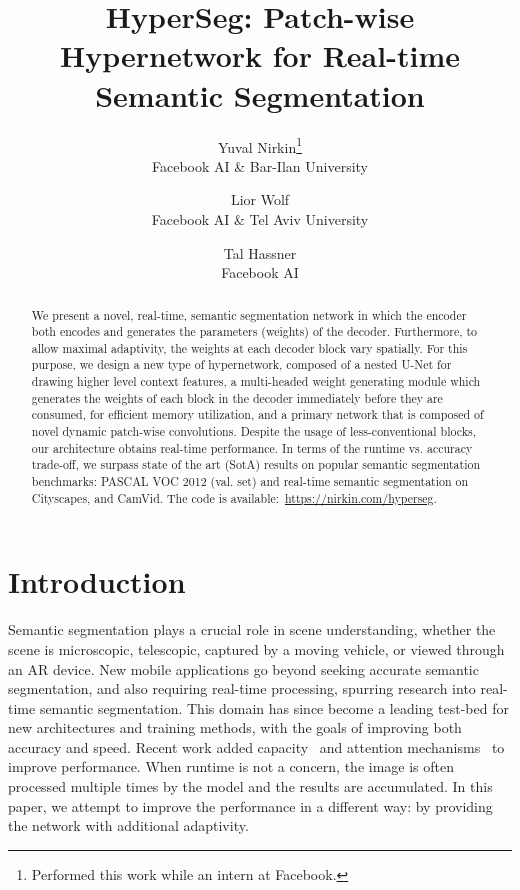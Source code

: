\documentclass[final]{cvpr}
\begin{document}
\title{HyperSeg: Patch-wise Hypernetwork for Real-time Semantic Segmentation}

\author{Yuval Nirkin\thanks{Performed this work while an intern at Facebook.}\\
Facebook AI \& Bar-Ilan University\\
\and
Lior Wolf\\
Facebook AI \& Tel Aviv University\\
\and
Tal Hassner\\
Facebook AI}


\maketitle


\begin{abstract}
We present a novel, real-time, semantic segmentation network in which the encoder both encodes and generates the parameters (weights) of the decoder. Furthermore, to allow maximal adaptivity, the weights at each decoder block vary spatially. For this purpose, we design a new type of hypernetwork, composed of a nested U-Net for drawing higher level context features, a multi-headed weight generating module which generates the weights of each block in the decoder immediately before they are consumed, for efficient memory utilization, and a primary network that is composed of novel dynamic patch-wise convolutions. Despite the usage of less-conventional blocks, our architecture obtains real-time performance. In terms of the runtime vs. accuracy trade-off, we surpass state of the art (SotA) results on popular semantic segmentation benchmarks: PASCAL VOC 2012 (val. set) and real-time semantic segmentation on Cityscapes, and CamVid.
The code is available:~\url{https://nirkin.com/hyperseg}.
\end{abstract}

\section{Introduction}
\label{sec:Introduction}

Semantic segmentation plays a crucial role in scene understanding, whether the scene is microscopic, telescopic, captured by a moving vehicle, or viewed through an AR device. New mobile applications go beyond seeking accurate semantic segmentation, and also requiring real-time processing, spurring research into real-time semantic segmentation. This domain has since become a leading test-bed for new architectures and training methods, with the goals of improving both accuracy and speed.
Recent work added capacity~\cite{chen2017rethinking,chen2018encoder} and attention mechanisms~\cite{ho2019axial,tao2020hierarchical,wang2020axial} to improve performance. When runtime is not a concern, the image is often processed multiple times by the model and the results are accumulated. In this paper, we attempt to improve the performance in a different way: by providing the network with additional adaptivity.
\end{document}
